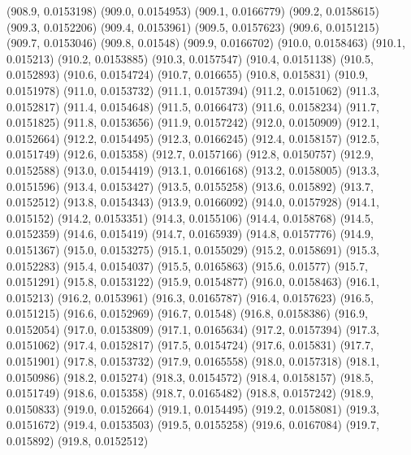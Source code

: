 {					(908.9, 0.0153198)
					(909.0, 0.0154953)
					(909.1, 0.0166779)
					(909.2, 0.0158615)
					(909.3, 0.0152206)
					(909.4, 0.0153961)
					(909.5, 0.0157623)
					(909.6, 0.0151215)
					(909.7, 0.0153046)
					(909.8, 0.01548)
					(909.9, 0.0166702)
					(910.0, 0.0158463)
					(910.1, 0.015213)
					(910.2, 0.0153885)
					(910.3, 0.0157547)
					(910.4, 0.0151138)
					(910.5, 0.0152893)
					(910.6, 0.0154724)
					(910.7, 0.016655)
					(910.8, 0.015831)
					(910.9, 0.0151978)
					(911.0, 0.0153732)
					(911.1, 0.0157394)
					(911.2, 0.0151062)
					(911.3, 0.0152817)
					(911.4, 0.0154648)
					(911.5, 0.0166473)
					(911.6, 0.0158234)
					(911.7, 0.0151825)
					(911.8, 0.0153656)
					(911.9, 0.0157242)
					(912.0, 0.0150909)
					(912.1, 0.0152664)
					(912.2, 0.0154495)
					(912.3, 0.0166245)
					(912.4, 0.0158157)
					(912.5, 0.0151749)
					(912.6, 0.015358)
					(912.7, 0.0157166)
					(912.8, 0.0150757)
					(912.9, 0.0152588)
					(913.0, 0.0154419)
					(913.1, 0.0166168)
					(913.2, 0.0158005)
					(913.3, 0.0151596)
					(913.4, 0.0153427)
					(913.5, 0.0155258)
					(913.6, 0.015892)
					(913.7, 0.0152512)
					(913.8, 0.0154343)
					(913.9, 0.0166092)
					(914.0, 0.0157928)
					(914.1, 0.015152)
					(914.2, 0.0153351)
					(914.3, 0.0155106)
					(914.4, 0.0158768)
					(914.5, 0.0152359)
					(914.6, 0.015419)
					(914.7, 0.0165939)
					(914.8, 0.0157776)
					(914.9, 0.0151367)
					(915.0, 0.0153275)
					(915.1, 0.0155029)
					(915.2, 0.0158691)
					(915.3, 0.0152283)
					(915.4, 0.0154037)
					(915.5, 0.0165863)
					(915.6, 0.01577)
					(915.7, 0.0151291)
					(915.8, 0.0153122)
					(915.9, 0.0154877)
					(916.0, 0.0158463)
					(916.1, 0.015213)
					(916.2, 0.0153961)
					(916.3, 0.0165787)
					(916.4, 0.0157623)
					(916.5, 0.0151215)
					(916.6, 0.0152969)
					(916.7, 0.01548)
					(916.8, 0.0158386)
					(916.9, 0.0152054)
					(917.0, 0.0153809)
					(917.1, 0.0165634)
					(917.2, 0.0157394)
					(917.3, 0.0151062)
					(917.4, 0.0152817)
					(917.5, 0.0154724)
					(917.6, 0.015831)
					(917.7, 0.0151901)
					(917.8, 0.0153732)
					(917.9, 0.0165558)
					(918.0, 0.0157318)
					(918.1, 0.0150986)
					(918.2, 0.015274)
					(918.3, 0.0154572)
					(918.4, 0.0158157)
					(918.5, 0.0151749)
					(918.6, 0.015358)
					(918.7, 0.0165482)
					(918.8, 0.0157242)
					(918.9, 0.0150833)
					(919.0, 0.0152664)
					(919.1, 0.0154495)
					(919.2, 0.0158081)
					(919.3, 0.0151672)
					(919.4, 0.0153503)
					(919.5, 0.0155258)
					(919.6, 0.0167084)
					(919.7, 0.015892)
					(919.8, 0.0152512)
}
